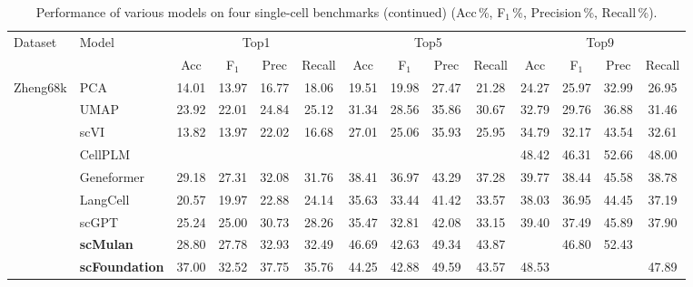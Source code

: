 \begin{table}[htbp]

  \centering

  \scriptsize

  \caption{Performance of various models on four single-cell benchmarks (continued) (Acc\,\%, F$_1$\,\%, Precision\,\%, Recall\,\%).}

  \label{tab:performance_acc_f1_precision_recall_all_cont}

  \setlength{\tabcolsep}{4pt}

  \begin{tabular}{llcccccccccccc}

    \toprule
    Dataset   & Model
      & \multicolumn{4}{c}{Top1}    & \multicolumn{4}{c}{Top5}
      & \multicolumn{4}{c}{Top9}    \\
    \cmidrule(lr){3-6}\cmidrule(lr){7-10}\cmidrule(lr){11-14}
              & 
      & Acc    & F$_1$    & Prec    & Recall
      & Acc    & F$_1$    & Prec    & Recall
      & Acc    & F$_1$    & Prec    & Recall   \\
    \midrule

    \multirow{9}{*}{Zheng68k}

      & PCA      &   14.01 &   13.97 &   16.77 &   18.06 &   19.51 &   19.98 &   27.47 &   21.28 &   24.27 &   25.97 &   32.99 &   26.95  \\
      & UMAP      &   23.92 &   22.01 &   24.84 &   25.12 &   31.34 &   28.56 &   35.86 &   30.67 &   32.79 &   29.76 &   36.88 &   31.46  \\
      & scVI      &   13.82 &   13.97 &   22.02 &   16.68 &   27.01 &   25.06 &   35.93 &   25.95 &   34.79 &   32.17 &   43.54 &   32.61  \\
      & CellPLM      & \cellcolor{gray!25}{44.68} & \cellcolor{gray!25}{36.59} & \cellcolor{gray!25}{41.13} & \cellcolor{gray!25}{40.10} & \cellcolor{gray!25}{47.21} & \cellcolor{gray!25}{43.13} & \cellcolor{gray!25}{49.73} & \cellcolor{gray!25}{44.55} &   48.42 &   46.31 &   52.66 &   48.00  \\
      & Geneformer      &   29.18 &   27.31 &   32.08 &   31.76 &   38.41 &   36.97 &   43.29 &   37.28 &   39.77 &   38.44 &   45.58 &   38.78  \\
      & LangCell      &   20.57 &   19.97 &   22.88 &   24.14 &   35.63 &   33.44 &   41.42 &   33.57 &   38.03 &   36.95 &   44.45 &   37.19  \\
      & scGPT      &   25.24 &   25.00 &   30.73 &   28.26 &   35.47 &   32.81 &   42.08 &   33.15 &   39.40 &   37.49 &   45.89 &   37.90  \\
      & \cellcolor{gray!25}\textbf{scMulan}      &   28.80 &   27.78 &   32.93 &   32.49 &   46.69 &   42.63 &   49.34 &   43.87 & \cellcolor{gray!25}{50.31} &   46.80 &   52.43 & \cellcolor{gray!25}{48.06}  \\
      & \cellcolor{gray!25}\textbf{scFoundation}      &   37.00 &   32.52 &   37.75 &   35.76 &   44.25 &   42.88 &   49.59 &   43.57 &   48.53 & \cellcolor{gray!25}{46.98} & \cellcolor{gray!25}{53.62} &   47.89  \\
    \midrule


\end{tabular}
\end{table}
